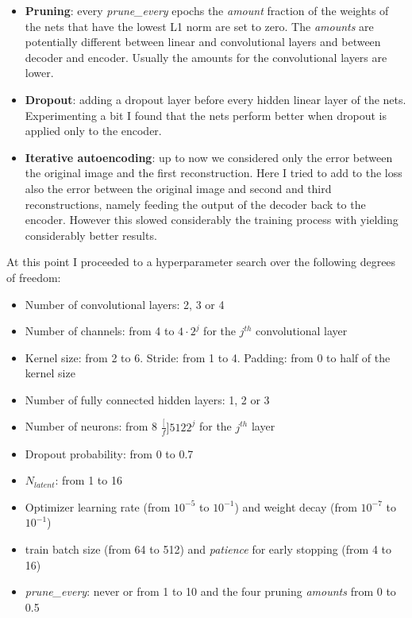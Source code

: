 \documentclass[a4paper, 11pt]{article}
\begin{document}
    \begin{itemize}
      \item \textbf{Pruning}: every \emph{prune\_every} epochs the \emph{amount} fraction of the weights of the nets that have the lowest L1 norm are set to zero. The \emph{amounts} are potentially different between linear and convolutional layers and between decoder and encoder. Usually the amounts for the convolutional layers are lower.
      \item \textbf{Dropout}: adding a dropout layer before every hidden linear layer of the nets. Experimenting a bit I found that the nets perform better when dropout is applied only to the encoder.
      \item \textbf{Iterative autoencoding}: up to now we considered only the error between the original image and the first reconstruction. Here I tried to add to the loss also the error between the original image and second and third reconstructions, namely feeding the output of the decoder back to the encoder. However this slowed considerably the training process with yielding considerably better results.
    \end{itemize}

    At this point I proceeded to a hyperparameter search over the following degrees of freedom:
    \begin{itemize}
      \item Number of convolutional layers: 2, 3 or 4
      \item Number of channels: from 4 to $4\cdot2^j$ for the $j^{th}$ convolutional layer
      \item Kernel size: from 2 to 6. Stride: from 1 to 4. Padding: from 0 to half of the kernel size
      \item Number of fully connected hidden layers: 1, 2 or 3
      \item Number of neurons: from 8 $\frac[f]{512}{2^j}$ for the $j^{th}$ layer
      \item Dropout probability: from 0 to 0.7
      \item $N_{latent}$: from 1 to 16
      \item Optimizer learning rate (from $10^{-5}$ to $10^{-1}$) and weight decay (from $10^{-7}$ to $10^{-1}$)
      \item train batch size (from 64 to 512) and \emph{patience} for early stopping (from 4 to 16)
      \item \emph{prune\_every}: never or from 1 to 10 and the four pruning \emph{amounts} from 0 to 0.5
    \end{itemize}
\end{document}
